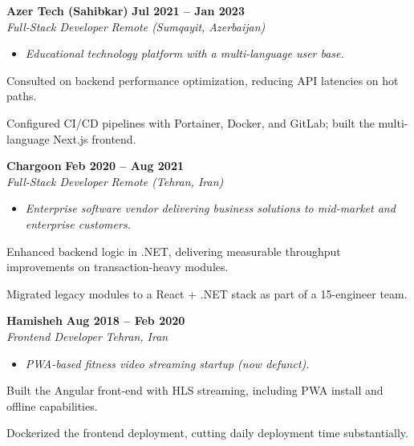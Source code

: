 \documentclass[letterpaper,10pt]{article}
\newcommand{\heading}[2]{
  \hspace{10pt}#1\hfill#2\\
}
\newcommand{\headingBf}[2]{
  \heading{\textbf{#1}}{\textbf{#2}}
}
\newcommand{\headingIt}[2]{
  \heading{\textit{#1}}{\textit{#2}}
}
\newenvironment{resume_list}{
  \vspace{-7pt}
  \begin{itemize}[itemsep=-2px, parsep=1pt, leftmargin=30pt]
}{
  \end{itemize}
  \vspace{1pt}
}
\newcommand{\companyDescription}[1]{
  \vspace{-7pt}
  \begin{itemize}[itemsep=-2px, parsep=1pt, leftmargin=12pt]
    \item[] {\color{textMuted}\textit{#1}}
  \end{itemize}
  \vspace{-4pt}
}
\begin{document}
  \headingBf{ Azer Tech (Sahibkar) }{ Jul 2021 -- Jan 2023 }
  \headingIt{ Full-Stack Developer }{ Remote (Sumqayit, Azerbaijan) }
  \companyDescription{ Educational technology platform with a multi-language user base. }
  \begin{resume_list}
    \item Consulted on backend performance optimization, reducing API latencies on hot paths.
    \item Configured CI/CD pipelines with Portainer, Docker, and GitLab; built the multi-language Next.js frontend.
  \end{resume_list}

  \headingBf{ Chargoon }{ Feb 2020 -- Aug 2021 }
  \headingIt{ Full-Stack Developer }{ Remote (Tehran, Iran) }
  \companyDescription{ Enterprise software vendor delivering business solutions to mid-market and enterprise customers. }
  \begin{resume_list}
    \item Enhanced backend logic in .NET, delivering measurable throughput improvements on transaction-heavy modules.
    \item Migrated legacy modules to a React + .NET stack as part of a 15-engineer team.
  \end{resume_list}

  \headingBf{ Hamisheh }{ Aug 2018 -- Feb 2020 }
  \headingIt{ Frontend Developer }{ Tehran, Iran }
  \companyDescription{ PWA-based fitness video streaming startup (now defunct). }
  \begin{resume_list}
    \item Built the Angular front-end with HLS streaming, including PWA install and offline capabilities.
    \item Dockerized the frontend deployment, cutting daily deployment time substantially.
  \end{resume_list}
\end{document}
